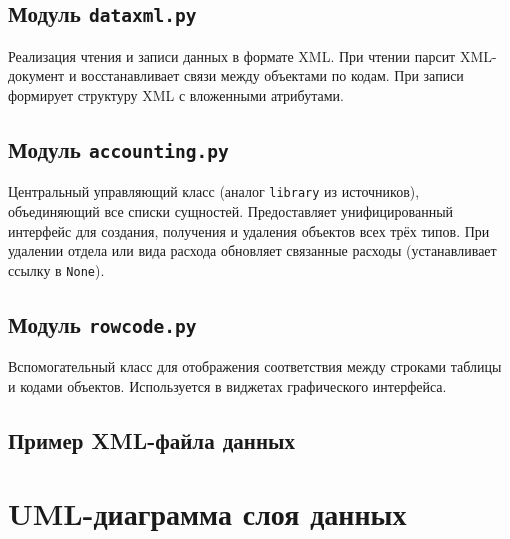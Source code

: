 \documentclass[14pt,a4paper]{extreport}
\begin{document}


\subsection{Модуль \texttt{dataxml.py}}

Реализация чтения и записи данных в формате XML. При чтении парсит XML-документ и восстанавливает связи между объектами по кодам. При записи формирует структуру XML с вложенными атрибутами.



\subsection{Модуль \texttt{accounting.py}}

Центральный управляющий класс (аналог \texttt{library} из источников), объединяющий все списки сущностей. Предоставляет унифицированный интерфейс для создания, получения и удаления объектов всех трёх типов. При удалении отдела или вида расхода обновляет связанные расходы (устанавливает ссылку в \texttt{None}).



\subsection{Модуль \texttt{rowcode.py}}

Вспомогательный класс для отображения соответствия между строками таблицы и кодами объектов. Используется в виджетах графического интерфейса.



\subsection{Пример XML-файла данных}



\section{UML-диаграмма слоя данных}
\end{document}
